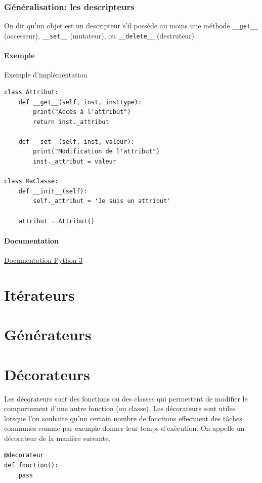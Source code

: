 \documentclass[a4paper, french, 10pt]{article}
\newcommand{\code}[1]{{\small\texttt{#1}}}
\begin{document}
\subsubsection{Généralisation: les descripteurs}
On dit qu'un objet est un descripteur s'il possède au moins une méthode \code{\_\_get\_\_} (accesseur), \code{\_\_set\_\_} (mutateur), ou \code{\_\_delete\_\_} (destruteur).

\paragraph{Exemple} Exemple d'implémentation
\begin{verbatim}
class Attribut:
    def __get__(self, inst, insttype):
        print("Accès à l'attribut")
        return inst._attribut

    def __set__(self, inst, valeur):
        print("Modification de l'attribut")
        inst._attribut = valeur

class MaClasse:
    def __init__(self):
        self._attribut = 'Je suis un attribut'

    attribut = Attribut()
\end{verbatim}

\paragraph{Documentation} \href{https://docs.python.org/3/howto/descriptor.html}{Documentation Python 3}

\section{Itérateurs}
\section{Générateurs}
\section{Décorateurs}
Les décorateurs sont des fonctions ou des classes qui permettent de modifier le comportement d'une autre fonction (ou classe). Les décorateurs sont utiles lorsque l'on souhaite qu'un certain nombre de fonctions effectuent des tâches communes comme par exemple donner leur temps d'exécution. On appelle un décorateur de la manière suivante.

\begin{verbatim}
@decorateur
def fonction():
    pass
\end{verbatim}
\end{document}
